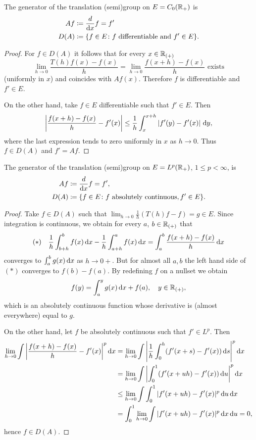 The generator of the translation (semi)group on $E = C_{0}(\mathbb{R}_{+})$ is 
\begin{align*}
    Af & \coloneqq \frac{d}{\mathop{}\!\mathrm{d}{x}}f = f' \\
    D(A) &\coloneqq \{f \in E \colon f \text{ differentiable and } f' \in E\}.
\end{align*}
\begin{proof}
For $f \in D(A)$ it follows that for every $x \in \mathbb{R}_{(+)}$
\[
    \lim_{h \to 0} \frac{T(h)f(x) - f(x)}{h} = \lim_{h \to 0} \frac{f(x+h) - f(x)}{h} \text{ exists}
\]
(uniformly in $x$) and coincides with $Af(x)$.
Therefore $f$ is differentiable and $f' \in E$.

On the other hand, take $f \in E$ differentiable such that $f' \in E$.
Then
\[
    \left|\frac{f(x+h) - f(x)}{h} - f'(x)\right| \leq \frac{1}{h}\int_{x}^{x+h}|f'(y) - f'(x)|\,\mathop{}\!\mathrm{d}{y},
\]
where the last expression tends to zero uniformly in $x$ as $h \to 0$.
Thus $f \in D(A)$ and $f' = Af$.
\end{proof}
The generator of the translation (semi)group on $E = L^{p}(\mathbb{R}_{+})$, $1 \leq p < \infty$, is
\begin{align*}
    Af &\coloneqq \frac{d}{\mathop{}\!\mathrm{d}{x}}f = f', \\
    D(A) &\coloneqq \{f \in E \colon f \text{ absolutely continuous}, f' \in E\}.
\end{align*}
\begin{proof}
Take $f \in D(A)$ such that $\lim_{h \to 0} \frac{1}{h}(T(h)f - f) = g \in E$.
Since integration is continuous, we obtain for every $a$, $b \in \mathbb{R}_{(+)}$ that
\begin{equation*}\label{eq:a1-2.1}
(*) \quad \frac{1}{h}\int_{b+h}^{b} f(x) \mathop{}\!\mathrm{d}{x} - \frac{1}{h}\int_{a+h}^{a} f(x) \mathop{}\!\mathrm{d}{x} = \int_{a}^{b} \frac{f(x+h) - f(x)}{h} \mathop{}\!\mathrm{d}{x}
\end{equation*}
converges to $\int_{a}^{b} g(x) \mathop{}\!\mathrm{d}{x}$ as $h \to 0+$.
But for almost all $a, b$ the left hand side of $(*)$ converges to $f(b) - f(a)$.
By redefining $f$ on a nullset we obtain
\[
    f(y) = \int_{a}^{y} g(x)\mathop{}\!\mathrm{d}{x} + f(a), \quad y \in \mathbb{R}_{(+)},
\]
which is an absolutely continuous function whose derivative is (almost everywhere) equal to $g$.

On the other hand, let $f$ be absolutely continuous such that $f' \in L^{p}$.
Then
\begin{align*}
    \lim_{h \to 0} \int \left|\frac{f(x+h) - f(x)}{h} - f'(x)\right|^{p} \dx 
    &= \lim_{h \to 0} \int \left|\frac{1}{h}\int_{0}^{h} (f'(x+s) - f'(x)) \ds\right|^{p} \dx \\
    &= \lim_{h \to 0} \int \left|\int_{0}^{1} (f'(x+uh) - f'(x)) \du\right|^{p} \dx \\
    &\leq \lim_{h \to 0} \int \int_{0}^{1} |f'(x+uh) - f'(x)|^{p} \du \dx \\
    &= \int_{0}^{1} \lim_{h \to 0} \int |f'(x+uh) - f'(x)|^{p} \dx \du = 0,
\end{align*}
hence $f \in D(A)$.
\end{proof}

